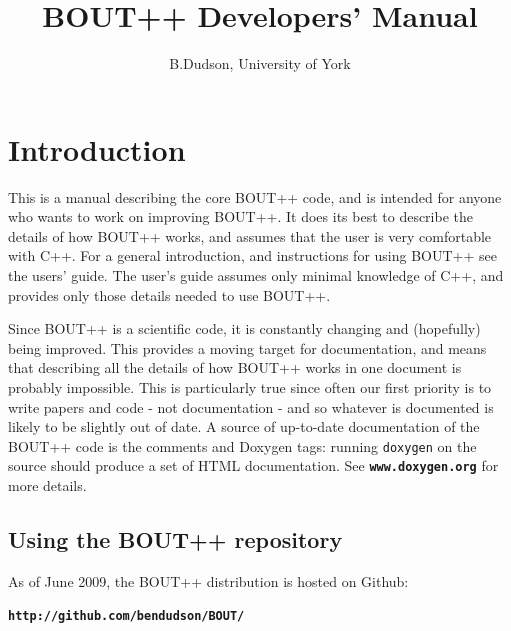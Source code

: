 \documentclass[12pt]{article}
\newcommand{\code}[1]{\texttt{#1}}
\newcommand{\file}[1]{\texttt{\bf #1}}
\begin{document}
\title{BOUT++ Developers' Manual}
\author{B.Dudson, University of York}

\maketitle

\tableofcontents

\section{Introduction}

This is a manual describing the core BOUT++ code\cite{Dudson2009,dudson-2008-arxiv},
and is intended for anyone who
wants to work on improving BOUT++. It does its best to describe
the details of how BOUT++ works, and assumes that the user is very comfortable
with C++. For a general introduction, and instructions for using BOUT++
see the users' guide. The user's guide assumes only minimal knowledge of C++,
and provides only those details needed to use BOUT++. 

Since BOUT++ is a scientific code, it is constantly changing and (hopefully)
being improved. This provides a moving target for documentation, and means
that describing all the details of how BOUT++ works in one document is probably
impossible. This is particularly true since often our first priority is to
write papers and code - not documentation - and so whatever is documented
is likely to be slightly out of date. A source of up-to-date documentation
of the BOUT++ code is the comments and Doxygen tags: running \code{doxygen}
on the source should produce a set of HTML documentation. See
\file{www.doxygen.org} for more details.

\subsection{Using the BOUT++ repository}

As of June 2009, the BOUT++ distribution is hosted on Github: 

\file{http://github.com/bendudson/BOUT/}
\end{document}
